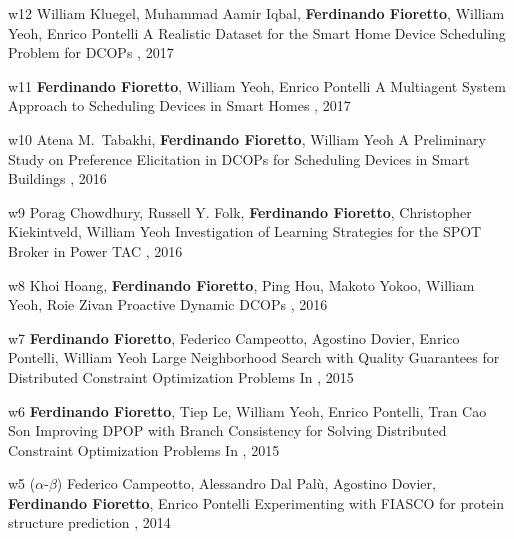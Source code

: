 \begin{pubs}
\wsentry
	{w12} %
	{William Kluegel, Muhammad Aamir Iqbal, {\bf Ferdinando Fioretto}, William Yeoh, Enrico Pontelli}
	{A Realistic Dataset for the Smart Home Device Scheduling Problem for DCOPs}
	{, 
	2017}
	{~}	

\wsentry
	{w11} %
	{{\bf Ferdinando Fioretto},  William Yeoh, Enrico Pontelli}
	{A Multiagent System Approach to Scheduling Devices in Smart Homes}
	{, 2017}
	{~}

	\wsentry
	{w10} %
	{Atena M.~Tabakhi, {\bf Ferdinando Fioretto}, William Yeoh}
	{A Preliminary Study on Preference Elicitation in DCOPs for Scheduling Devices in Smart Buildings}
	{, 2016}
	{~}

\wsentry 
	{w9} %
	{Porag Chowdhury, Russell Y. Folk, {\bf Ferdinando Fioretto}, Christopher Kiekintveld, William Yeoh}
	{Investigation of Learning Strategies for the SPOT Broker in Power TAC}
  	{, 2016}
	{~}

\wsentry 
	{w8} %
	{Khoi Hoang, {\bf Ferdinando Fioretto}, Ping Hou, Makoto Yokoo, William Yeoh, Roie Zivan}
	{Proactive Dynamic DCOPs} 
	{, 2016}
	{~}	

\wsentry
	{w7} %
	{{\bf Ferdinando Fioretto}, Federico Campeotto, Agostino Dovier, Enrico Pontelli, William Yeoh}
	{Large Neighborhood Search with Quality Guarantees for Distributed Constraint Optimization Problems} 
	{In , 2015}
	{~}

\wsentry 
	{w6} %
	{{\bf Ferdinando Fioretto}, Tiep Le, William Yeoh, Enrico Pontelli, Tran Cao Son}
	{Improving DPOP with Branch Consistency for Solving Distributed Constraint Optimization Problems}
	{In , 2015}
	{~}

\wsentry 
	{w5} %
	{($\alpha$-$\beta$) 
	Federico Campeotto, Alessandro Dal Pal\`{u}, Agostino Dovier, {\bf Ferdinando Fioretto}, Enrico Pontelli} 
  	{Experimenting with FIASCO for protein structure prediction}
	{, 2014}
	{~}


\end{pubs}
